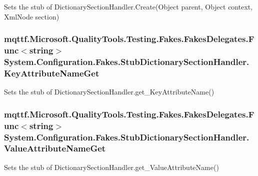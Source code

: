 Sets the stub of Dictionary\-Section\-Handler.\-Create(\-Object parent, Object context, Xml\-Node section)

\hypertarget{class_system_1_1_configuration_1_1_fakes_1_1_stub_dictionary_section_handler_a2383ff7c2b13cc23f3a75b4bd472b27c}{
\subsubsection[{Key\-Attribute\-Name\-Get}]{\setlength{\rightskip}{0pt plus 5cm}mqttf.\-Microsoft.\-Quality\-Tools.\-Testing.\-Fakes.\-Fakes\-Delegates.\-Func$<$string$>$ System.\-Configuration.\-Fakes.\-Stub\-Dictionary\-Section\-Handler.\-Key\-Attribute\-Name\-Get}}\label{class_system_1_1_configuration_1_1_fakes_1_1_stub_dictionary_section_handler_a2383ff7c2b13cc23f3a75b4bd472b27c}


Sets the stub of Dictionary\-Section\-Handler.\-get\-\_\-\-Key\-Attribute\-Name()

\hypertarget{class_system_1_1_configuration_1_1_fakes_1_1_stub_dictionary_section_handler_a00149579e7e9b4efcfca7f841b93ec95}{
\subsubsection[{Value\-Attribute\-Name\-Get}]{\setlength{\rightskip}{0pt plus 5cm}mqttf.\-Microsoft.\-Quality\-Tools.\-Testing.\-Fakes.\-Fakes\-Delegates.\-Func$<$string$>$ System.\-Configuration.\-Fakes.\-Stub\-Dictionary\-Section\-Handler.\-Value\-Attribute\-Name\-Get}}\label{class_system_1_1_configuration_1_1_fakes_1_1_stub_dictionary_section_handler_a00149579e7e9b4efcfca7f841b93ec95}


Sets the stub of Dictionary\-Section\-Handler.\-get\-\_\-\-Value\-Attribute\-Name()



